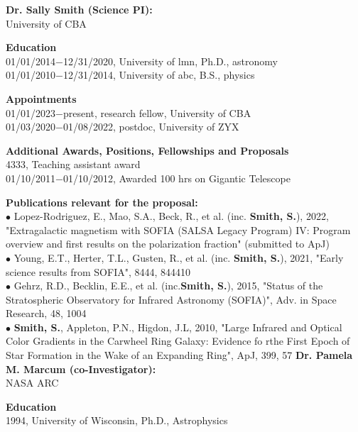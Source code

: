 \newpage
\textbf{\color{Blue}\large Dr. Sally Smith (Science PI):}\\
University of CBA
\par \vspace{-0.5em}
\textbf{Education}\\
01/01/2014$-$12/31/2020, University of lmn, Ph.D., astronomy\\
01/01/2010$-$12/31/2014, University of abc, B.S., physics
\par \vspace{-0.5em}
\textbf{Appointments}\\
01/01/2023$-$present, research fellow, University of CBA\\
01/03/2020$-$01/08/2022, postdoc, University of ZYX
\par \vspace{-0.5em}
\textbf{Additional Awards, Positions, Fellowships and Proposals}\\
4333, Teaching assistant award\\
01/10/2011$-$01/10/2012, Awarded 100 hrs on Gigantic Telescope
\par \vspace{-0.5em}
\textbf{Publications relevant for the proposal:}\\
{\scriptsize{$\bullet$}} Lopez-Rodriguez, E., Mao, S.A., Beck, R., et al. (inc. \textbf{Smith, S.}), 2022, "Extragalactic magnetism with SOFIA (SALSA Legacy Program) IV: Program overview and first results on the polarization fraction" (submitted to ApJ)\\
{\scriptsize{$\bullet$}} Young, E.T., Herter, T.L., Gusten, R., et al. (inc. \textbf{Smith, S.}), 2021, "Early science results from SOFIA", 8444, 844410\\
{\scriptsize{$\bullet$}} Gehrz, R.D., Becklin, E.E., et al. (inc.\textbf{Smith, S.}), 2015, "Status of the Stratospheric Observatory for Infrared Astronomy (SOFIA)", Adv. in Space Research, 48, 1004\\
{\scriptsize{$\bullet$}} \textbf{Smith, S.}, Appleton, P.N., Higdon, J.L, 2010, "Large Infrared and Optical Color Gradients in the Carwheel Ring Galaxy: Evidence fo rthe First Epoch of Star Formation in the Wake of an Expanding Ring", ApJ, 399, 57
\newpage
\textbf{\color{Blue}\large Dr. Pamela M. Marcum (co-Investigator):}\\
NASA ARC
\par \vspace{-0.5em}
\textbf{Education}\\
1994, University of Wisconsin, Ph.D., Astrophysics\\
